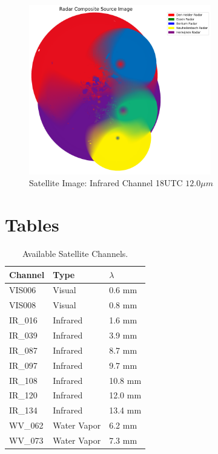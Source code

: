 \documentclass[acmtog, authorversion]{acmart}
\begin{document}
\begin{figure}[hbp]
  \centering
  \includegraphics[width=225pt]{./images/radar_source.png}
  \caption{Satellite Image: Infrared Channel 18UTC $12.0\mu m$}
  \Description{}
  \label{fig:source}
\end{figure}

\section{Tables}

\begin{table}[hbp]
  \caption{Available Satellite Channels.}
  \begin{tabular}{@{}lll@{}}
  \toprule
  Channel & Type        & $\lambda$ \\ \midrule
  VIS006  & Visual      & 0.6 mm      \\
  VIS008  & Visual      & 0.8 mm      \\
  IR\_016 & Infrared    & 1.6 mm      \\
  IR\_039 & Infrared    & 3.9 mm      \\
  IR\_087 & Infrared    & 8.7 mm      \\
  IR\_097 & Infrared    & 9.7 mm      \\
  IR\_108 & Infrared    & 10.8 mm     \\
  IR\_120 & Infrared    & 12.0 mm     \\
  IR\_134 & Infrared    & 13.4 mm     \\
  WV\_062 & Water Vapor & 6.2 mm      \\
  WV\_073 & Water Vapor & 7.3 mm      \\ \bottomrule
  \end{tabular}
  \label{tab:channels}
\end{table}
\end{document}
